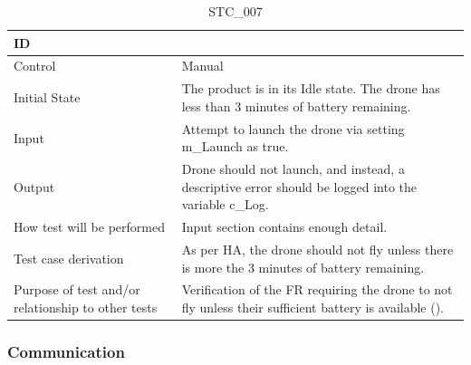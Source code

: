 \documentclass[12pt, titlepage]{article}
\begin{document}
\begin{table}[!h]
\begin{center}
\caption {STC\_007}
\label{tab:STC_007}
\begin{tabular}{ | m{3.2cm} | m{12.2cm} | } 
\hline
ID & \nameref{tab:STC_007} \\ 
\hline
Control & Manual \\ 
\hline
Initial State & The product is in its Idle state. The drone has less than 3 minutes of battery remaining.  \\ 
\hline
Input & Attempt to launch the drone via setting m\_Launch as true. \\ 
\hline
Output & Drone should not launch, and instead, a descriptive error should be logged into the variable c\_Log.  \\ 
\hline
How test will be performed & Input section contains enough detail. \\ 
\hline
Test case derivation & As per HA, the drone should not fly unless there is more the 3 minutes of battery remaining.
 \\ 
\hline
Purpose of test and/or relationship to other tests & Verification of the FR requiring the drone to not fly unless their sufficient battery is available (\nameref{SR_012}). 
\\ 
\hline
\end{tabular}
\end{center}
\end{table}

\clearpage

\subsubsection{Communication}
\end{document}

